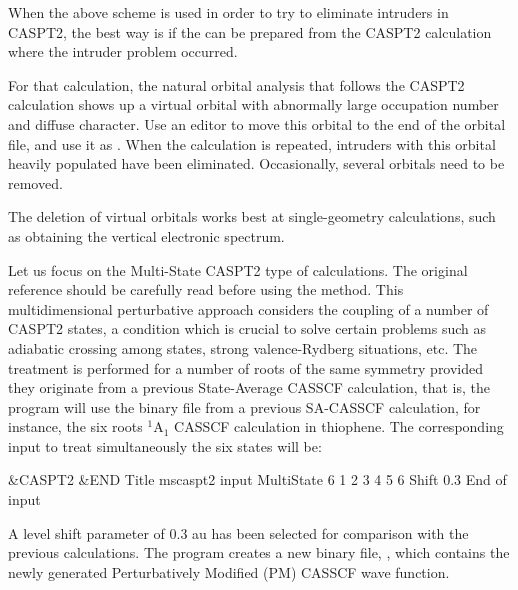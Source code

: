 When the above scheme is used in order to try to eliminate intruders in
CASPT2, the best way is if the  can be prepared from the
CASPT2 calculation where the intruder problem occurred.

For that calculation, the natural orbital analysis that
follows the CASPT2 calculation shows up a virtual orbital with abnormally
large occupation number and diffuse character. Use an editor to move this orbital
to the end of the orbital file, and use it as .
When the calculation is repeated, intruders with this orbital heavily
populated have been eliminated.
Occasionally, several orbitals need to be removed.

The deletion of virtual orbitals works best at single-geometry
calculations, such as obtaining the vertical electronic spectrum.


Let us focus on the Multi-State CASPT2 type of calculations. The original
reference \cite{Finley:98b} should be carefully read before using the method.
This multidimensional perturbative approach considers the coupling of a number
of CASPT2 states, a condition which is crucial to solve certain problems such
as adiabatic crossing among states, strong valence-Rydberg situations, etc.
The treatment is performed for a number of roots of the same symmetry provided
they originate from a previous State-Average CASSCF calculation, that is, the
 program will use the binary  file from a 
previous SA-CASSCF calculation, for instance, the six roots $^1$A$_1$ CASSCF
calculation in thiophene. The corresponding  input to treat
simultaneously the six states will be:

\begin{inputlisting}
 &CASPT2 &END
Title
 mscaspt2 input
MultiState
6 1 2 3 4 5 6
Shift
0.3
End of input
\end{inputlisting}

A level shift parameter of 0.3 au has been selected for comparison with the
previous calculations. The program creates a new
binary file, , which contains the newly generated Perturbatively
Modified (PM) CASSCF wave function.

